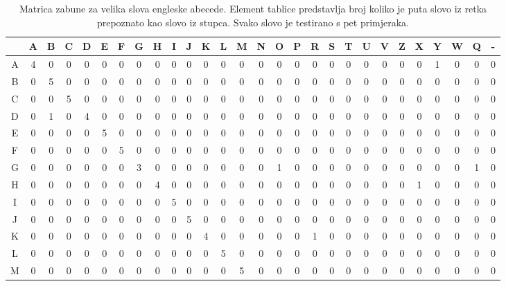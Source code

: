 \begin{table}[]
\setlength{\tabcolsep}{2pt}
\centering
\caption{Matrica zabune za velika slova engleske abecede. Element tablice predstavlja broj koliko je puta slovo iz retka prepoznato kao slovo iz stupca. Svako slovo je testirano s pet primjeraka.}
\label{confusion_matrix_eng}
\begin{tabular}{c|c|c|c|c|c|c|c|c|c|c|c|c|c|c|c|c|c|c|c|c|c|c|c|c|c|c|c}
\cline{2-28}
  & A & B & C & D & E & F & G & H & I & J & K & L & M & N & O & P & R & S & T & U & V & Z & X & Y & W & Q & - \\ \hline
A & 4 & 0 & 0 & 0 & 0 & 0 & 0 & 0 & 0 & 0 & 0 & 0 & 0 & 0 & 0 & 0 & 0 & 0 & 0 & 0 & 0 & 0 & 0 & 1 & 0 & 0 & 0 \\ \hline
B & 0 & 5 & 0 & 0 & 0 & 0 & 0 & 0 & 0 & 0 & 0 & 0 & 0 & 0 & 0 & 0 & 0 & 0 & 0 & 0 & 0 & 0 & 0 & 0 & 0 & 0 & 0 \\ \hline
C & 0 & 0 & 5 & 0 & 0 & 0 & 0 & 0 & 0 & 0 & 0 & 0 & 0 & 0 & 0 & 0 & 0 & 0 & 0 & 0 & 0 & 0 & 0 & 0 & 0 & 0 & 0 \\ \hline
D & 0 & 1 & 0 & 4 & 0 & 0 & 0 & 0 & 0 & 0 & 0 & 0 & 0 & 0 & 0 & 0 & 0 & 0 & 0 & 0 & 0 & 0 & 0 & 0 & 0 & 0 & 0 \\ \hline
E & 0 & 0 & 0 & 0 & 5 & 0 & 0 & 0 & 0 & 0 & 0 & 0 & 0 & 0 & 0 & 0 & 0 & 0 & 0 & 0 & 0 & 0 & 0 & 0 & 0 & 0 & 0 \\ \hline
F & 0 & 0 & 0 & 0 & 0 & 5 & 0 & 0 & 0 & 0 & 0 & 0 & 0 & 0 & 0 & 0 & 0 & 0 & 0 & 0 & 0 & 0 & 0 & 0 & 0 & 0 & 0 \\ \hline
G & 0 & 0 & 0 & 0 & 0 & 0 & 3 & 0 & 0 & 0 & 0 & 0 & 0 & 0 & 1 & 0 & 0 & 0 & 0 & 0 & 0 & 0 & 0 & 0 & 0 & 1 & 0 \\ \hline
H & 0 & 0 & 0 & 0 & 0 & 0 & 0 & 4 & 0 & 0 & 0 & 0 & 0 & 0 & 0 & 0 & 0 & 0 & 0 & 0 & 0 & 0 & 1 & 0 & 0 & 0 & 0 \\ \hline
I & 0 & 0 & 0 & 0 & 0 & 0 & 0 & 0 & 5 & 0 & 0 & 0 & 0 & 0 & 0 & 0 & 0 & 0 & 0 & 0 & 0 & 0 & 0 & 0 & 0 & 0 & 0 \\ \hline
J & 0 & 0 & 0 & 0 & 0 & 0 & 0 & 0 & 0 & 5 & 0 & 0 & 0 & 0 & 0 & 0 & 0 & 0 & 0 & 0 & 0 & 0 & 0 & 0 & 0 & 0 & 0 \\ \hline
K & 0 & 0 & 0 & 0 & 0 & 0 & 0 & 0 & 0 & 0 & 4 & 0 & 0 & 0 & 0 & 0 & 1 & 0 & 0 & 0 & 0 & 0 & 0 & 0 & 0 & 0 & 0 \\ \hline
L & 0 & 0 & 0 & 0 & 0 & 0 & 0 & 0 & 0 & 0 & 0 & 5 & 0 & 0 & 0 & 0 & 0 & 0 & 0 & 0 & 0 & 0 & 0 & 0 & 0 & 0 & 0 \\ \hline
M & 0 & 0 & 0 & 0 & 0 & 0 & 0 & 0 & 0 & 0 & 0 & 0 & 5 & 0 & 0 & 0 & 0 & 0 & 0 & 0 & 0 & 0 & 0 & 0 & 0 & 0 & 0 \\ \hline

\end{tabular}
\end{table}
